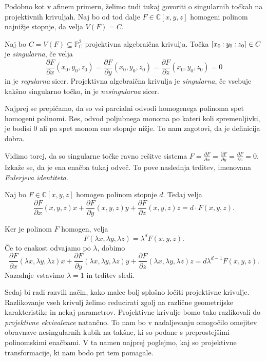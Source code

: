 \documentclass[mat1]{fmfdelo}
\numberwithin{equation}{section}
\newcommand{\C}{\mathbb C}
\newcommand{\PC}{\mathbb{P}^2_\C}
\newcommand{\Cxyz}{\C[x,y,z]}
\newcommand{\pcoor}[1]{%
\begingroup\lccode`~=`: \lowercase{\endgroup
\edef~}{\mathbin{\mathchar\the\mathcode`:}\nobreak}%
\left[%
\begingroup
\mathcode`:=\string"8000
#1%
\endgroup
\right]%
}
\newcommand{\pdv}[2][]{\frac{\partial#1}{\partial#2}}
\theoremstyle{definition}
\begin{document}
Podobno kot v afinem primeru, želimo tudi tukaj govoriti o singularnih točkah na projektivnih krivuljah. Naj bo od tod dalje $F \in \C[x,y,z]$ homogeni polinom najnižje stopnje, da velja $V(F) = C$.

\begin{definicija}
    Naj bo $C = V(F) \subseteq \PC$ projektivna algebraična krivulja. Točka $\pcoor{x_0:y_0:z_0} \in C$ je \emph{singularna}, če velja
    \[
        \pdv[F]{x}(x_0, y_0, z_0) = \pdv[F]{y}(x_0, y_0, z_0) = \pdv[F]{z}(x_0, y_0, z_0) = 0
    \]
    in je \emph{regularna} sicer. Projektivna algebraična krivulja je \emph{singularna}, če vsebuje kakšno singularno točko, in je \emph{nesingularna} sicer.
\end{definicija}

Najprej se prepičamo, da so vsi parcialni odvodi homogenega polinoma spet homogeni polinomi. Res, odvod poljubnega monoma po kateri koli spremenljivki, je bodisi $0$ ali pa spet monom ene stopnje nižje. To nam zagotovi, da je definicija dobra.

Vidimo torej, da so singularne točke ravno rešitve sistema $F = \pdv[F]{x}= \pdv[F]{y} = \pdv[F]{z} = 0$.
Izkaže se, da je ena enačba tukaj odveč. To pove naslednja trditev, imenovana \emph{Eulerjeva identiteta}.

\begin{trditev}
    Naj bo $F \in \Cxyz$ homogen polinom stopnje $d$. Tedaj velja
    \[
        \pdv[F]{x}(x,y,z)x + \pdv[F]{y}(x,y,z)y + \pdv[F]{z}(x,y,z)z = d \cdot F(x,y,z). 
    \]
\end{trditev}

\begin{dokaz}
    Ker je polinom $F$ homogen, velja 
    \[
        F(\lambda x, \lambda y, \lambda z) = \lambda^d F(x,y,z).
    \]
    Če to enakost odvajamo po $\lambda$, dobimo
    \[
        \pdv[F]{x}(\lambda x,\lambda y,\lambda z)x + 
        \pdv[F]{y}(\lambda x,\lambda y,\lambda z) y + 
        \pdv[F]{z}(\lambda x,\lambda y,\lambda z) z = d\lambda^{d-1}F(x,y,z).
    \]
    Nazadnje vstavimo $\lambda = 1$ in trditev sledi.
\end{dokaz}

Sedaj bi radi razvili način, kako malce bolj splošno ločiti projektivne krivulje. Razlikovanje vseh krivulj želimo reducirati zgolj na različne geometrijske karakteristike in nekaj parametrov. 
Projektivne krivulje bomo tako razlikovali do \emph{projektivne ekvivalence} natančno. 
To nam bo v nadaljevanju omogočilo omejitev obravnave nesingularnih kubik na takšne, ki so podane s preprostejšimi polinomskimi enačbami.
V ta namen najprej poglejmo, kaj so projektivne transformacije, ki nam bodo pri tem pomagale.
\end{document}
